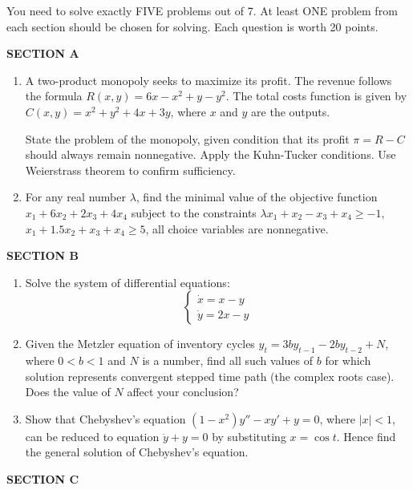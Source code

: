 You need to solve exactly FIVE problems out of 7. At least ONE problem from each section should be chosen for solving. Each question is worth 20 points.

\vspace{20pt}
\textbf{SECTION A}
\vspace{20pt}

\begin{enumerate}
\item A two-product monopoly seeks to maximize its profit. The revenue  follows the formula $R(x,y)=6x-x^2+y-y^2$. The total costs function is given by $C(x,y)=x^2+y^2+4x+3y$, where $x$ and $y$ are the outputs.

State the problem of the monopoly, given condition that its profit $\pi=R-C$ should always remain nonnegative. Apply the Kuhn-Tucker conditions. Use Weierstrass theorem to confirm sufficiency.
\item For any real number $\lambda$, find the minimal value of the objective function $x_1+6x_2+2x_3+4x_4$ subject to the constraints  $\lambda x_1+x_2-x_3+x_4\geq -1$, $x_1+1.5x_2+x_3+x_4 \geq 5$,  all choice variables are nonnegative.
\end{enumerate}

\vspace{20pt}
\textbf{SECTION B}
\vspace{20pt}

\begin{enumerate}[resume]
\item Solve the system of differential equations:
\[
\begin{cases}
\dot{x}=x-y \\
\dot{y}=2x-y
\end{cases}
\]
\item Given the Metzler equation of inventory cycles $y_t=3by_{t-1}-2by_{t-2}+N$, where $0<b<1$ and $N$ is a number, find all such values of $b$ for which solution represents convergent stepped time path (the complex roots case). Does the value of $N$ affect your conclusion?
\item Show that Chebyshev’s equation $(1-x^2)y''-xy'+y=0$, where $|x|<1$, can be reduced to equation $\ddot{y}+y=0$ by substituting $x=\cos t$. Hence find the general solution of Chebyshev’s equation.
\end{enumerate}

\vspace{20pt}
\textbf{SECTION C}
\vspace{20pt}

